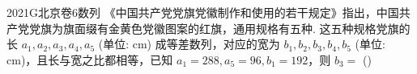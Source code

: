 
\begin{problem}{2021}{G}{北京卷}{6}{数列}
《中国共产党党旗党徽制作和使用的若干规定》指出，中国共产党党旗为旗面缀有金黄色党徽图案的红旗，通用规格有五种. 这五种规格党旗的长 $a_1, a_2, a_3, a_4, a_5$ (单位: cm) 成等差数列，对应的宽为 $b_1, b_2, b_3, b_4, b_5$ (单位: cm)，且长与宽之比都相等，已知 $a_1=288, a_5=96, b_1=192$，则 $b_3=$
(\hspace{1cm})
\begin{choices}
\end{choices}
\end{problem}